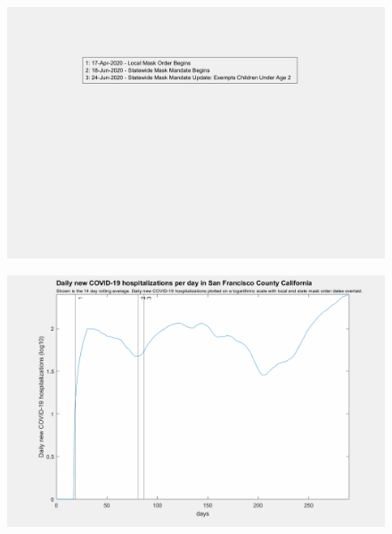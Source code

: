 \documentclass[]{article}
\begin{document}
\begin{figure}[!h]
	\includegraphics[width=\linewidth]{legends/san_francisco_mask_order_legend.png}
	\caption{}
	\label{fig:legends/san_francisco_mask_order_legendLabel}
\end{figure}

\begin{figure}[!h]
	\includegraphics[width=\linewidth]{images/san_francisco_mask_order_hospitalizations_log.png}
	\caption{}
	\label{fig:images/san_francisco_mask_order_hospitalizations_logLabel}
\end{figure}
\end{document}
